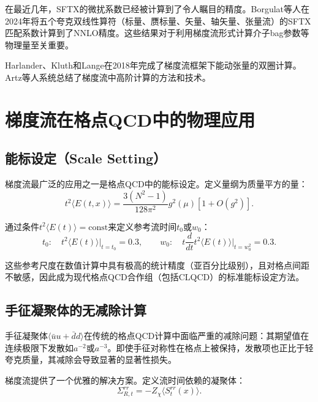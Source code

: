 \documentclass[12pt,a4paper]{ctexart}
\theoremstyle{definition}
\begin{document}
在最近几年，SFTX的微扰系数已经被计算到了令人瞩目的精度。Borgulat等人在2024年将五个夸克双线性算符（标量、赝标量、矢量、轴矢量、张量流）的SFTX匹配系数计算到了NNLO精度\cite{Borgulat2024}。这些结果对于利用梯度流形式计算介子bag参数等物理量至关重要。

Harlander、Kluth和Lange在2018年完成了梯度流框架下能动张量的双圈计算\cite{Harlander2018}。Artz等人系统总结了梯度流中高阶计算的方法和技术\cite{Artz2019}。

\section{梯度流在格点QCD中的物理应用}\label{sec:applications}

\subsection{能标设定（Scale Setting）}

梯度流最广泛的应用之一是格点QCD中的能标设定\cite{Luscher2010,Luscher2014}。定义量纲为质量平方的量：
\begin{equation}
t^2 \langle E(t,x) \rangle = \frac{3(N^2-1)}{128\pi^2} g^2(\mu) \left[ 1 + O(g^2) \right].
\label{eq:t2E}
\end{equation}

通过条件$t^2 \langle E(t) \rangle = \text{const}$来定义参考流时间$t_0$或$w_0$：
\begin{equation}
t_0: \quad t^2 \langle E(t) \rangle \big|_{t=t_0} = 0.3, \qquad
w_0: \quad t \frac{d}{dt} t^2 \langle E(t) \rangle \big|_{t=w_0^2} = 0.3.
\label{eq:t0_w0}
\end{equation}

这些参考尺度在数值计算中具有极高的统计精度（亚百分比级别），且对格点间距不敏感，因此成为现代格点QCD合作组（包括CLQCD）的标准能标设定方法。

\subsection{手征凝聚体的无减除计算}

手征凝聚体$\langle \bar{u}u + \bar{d}d \rangle$在传统的格点QCD计算中面临严重的减除问题：其期望值在连续极限下发散如$a^{-2}$或$a^{-3}$。即使手征对称性在格点上被保持，发散项也正比于轻夸克质量，其减除会导致显著的显著性损失。

梯度流提供了一个优雅的解决方案\cite{Luscher2013,Luscher2014}。定义流时间依赖的凝聚体：
\begin{equation}
\Sigma_{R,t}^{rr} = -Z_\chi \langle S_t^{rr}(x) \rangle.
\label{eq:Sigma_flow}
\end{equation}
\end{document}
